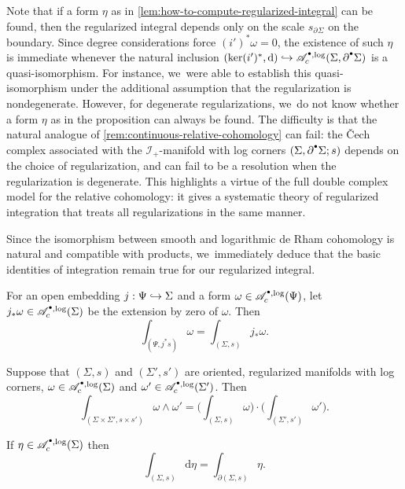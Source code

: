 \documentclass[JEP,XML,SOM,Unicode,NoFloatCountersInSection,published]{cedram}
\let\oldbullet\bullet
\renewcommand{\bullet}{{\raisebox{1pt}{$\scriptscriptstyle\oldbullet$}}}
\newcommand\hto{\mathrel{\lhook\joinrel\to}}
\newcommand{\rbbrac}[1]{\biggl(#1\biggr)}
\theoremstyle{definition}
\theoremstyle{remark}
\newenvironment{remark}
  {\pushQED{\qed}\renewcommand{\qedsymbol}{$\lozenge$}\remarkx}
  {\popQED\endremarkx}
\newcommand{\dd}{\mathrm{d}}
\newcommand{\Alogc}[2][\bullet]{\mathscr{A}^{#1,\log}_c(#2)}
\newcommand{\Sig}{\Sigma}
\newcommand{\bdSig}[1][]{\partial^{#1}\Sigma}
\newcommand{\ascat}{\mathscr{I}_+}
\begin{document}
\begin{remark}
Note that if a form $\eta$ as in \autoref{lem:how-to-compute-regularized-integral} can be found, then the regularized integral depends only on the scale $s_{\bdSig}$ on the boundary. Since degree considerations force $(i')^*\omega = 0$, the existence of such $\eta$ is immediate whenever the natural inclusion $(\ker (i')^*,\dd) \hto \Alogc{\Sig,\bdSig[\bullet]}$ is a quasi-isomorphism. For instance, we~were able to establish this quasi-isomorphism under the additional assumption that the regularization is nondegenerate. However, for degenerate regularizations, we~do not know whether a form $\eta$ as in the proposition can always be found. The difficulty is that the natural analogue of \autoref{rem:continuous-relative-cohomology} can fail: the \v{C}ech complex associated with the $\ascat$-manifold with log corners $(\Sig,\bdSig[\bullet];s)$ depends on the choice of regularization, and can fail to be a resolution when the regularization is degenerate. This highlights a virtue of the full double complex model for the relative cohomology: it gives a systematic theory of regularized integration that treats all regularizations in the same manner.
\end{remark}

Since the isomorphism between smooth and logarithmic de Rham cohomology is natural and compatible with products, we~immediately deduce that the basic identities of integration remain true for our regularized integral.

\begin{corollary}
For an open embedding $j : \Psi \hto \Sig$ and a form $\omega \in \Alogc{\Psi}$, let $j_*\omega \in \Alogc{\Sig}$ be the extension by zero of $\omega$. Then
\[
\int_{(\Psi,j^*s)} \omega = \int_{(\Sig,s)}j_*\omega.
\]
\end{corollary}
\begin{corollary}
Suppose that $(\Sig,s)$ and $(\Sig',s')$ are oriented, regularized manifolds with log corners, $\omega \in \Alogc{\Sig}$ and $\omega' \in \Alogc{\Sig'}$. Then
\[
\int_{(\Sig\times\Sig',s\times s')}\omega \wedge \omega' = \rbbrac{\int_{(\Sig,s)} \omega } \cdot \rbbrac{\int_{(\Sig',s')}\omega'}.
\]
\end{corollary}

\begin{corollary}\label{cor:reg-stokes}
If $\eta \in \Alogc[\bullet]{\Sig}$ then
\[
\int_{(\Sig,s)} \dd \eta = \int_{\partial(\Sig,s)} \eta.
\]
\end{corollary}
\end{document}
